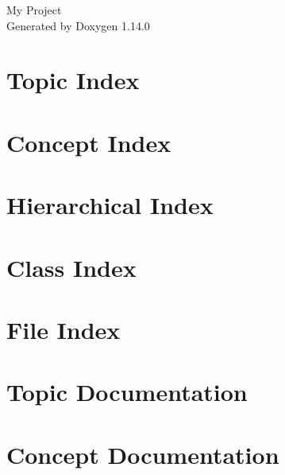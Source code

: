 \documentclass[twoside]{book}
\newcommand{\+}{\discretionary{\mbox{\scriptsize$\hookleftarrow$}}{}{}}
\newcommand{\clearemptydoublepage}{%
    \newpage{\pagestyle{empty}\cleardoublepage}%
  }
\begin{document}
  \raggedbottom
    \hypersetup{pageanchor=false,
                bookmarksnumbered=true,
                pdfencoding=unicode
               }
  \begin{titlepage}
  \vspace*{7cm}
  \begin{center}%
  {\Large My Project}\\
  \vspace*{1cm}
  {\large Generated by Doxygen 1.14.0}\\
  \end{center}
  \end{titlepage}
  \clearemptydoublepage
  \tableofcontents
  \clearemptydoublepage
  \hypersetup{pageanchor=true}



\chapter{Topic Index}

\chapter{Concept Index}

\chapter{Hierarchical Index}

\chapter{Class Index}

\chapter{File Index}

\chapter{Topic Documentation}

\chapter{Concept Documentation}


\end{document}

